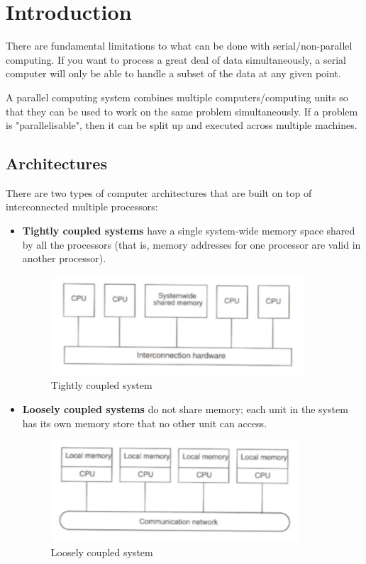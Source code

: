 \chapter{Introduction}
There are fundamental limitations to what can be done with serial/non-parallel computing. If you want to process a great deal of data simultaneously, a serial computer will only be able to handle a subset of the data at any given point.

A parallel computing system combines multiple computers/computing units so that they can be used to work on the same problem simultaneously. If a problem is "parallelisable", then it can be split up and executed across multiple machines.

\section{Architectures}
There are two types of computer architectures that are built on top of interconnected multiple processors:
\begin{itemize}
\item \textbf{Tightly coupled systems} have a single system-wide memory space shared by all the processors (that is, memory addresses for one processor are valid in another processor). \begin{figure}[h]
\centering
\includegraphics[width=0.5\linewidth]{figures/screenshot001}
\caption{Tightly coupled system}

\label{fig:screenshot001}
\end{figure}
\item \textbf{Loosely coupled systems} do not share memory; each unit in the system has its own memory store that no other unit can access. \begin{figure}
\centering
\includegraphics[width=0.7\linewidth]{figures/screenshot002}
\caption{Loosely coupled system}
\label{fig:screenshot002}
\end{figure}

\end{itemize}

